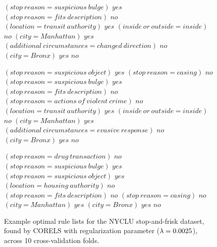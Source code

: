 \begin{figure}[h!]
\begin{algorithmic}
\State \belif $(stop~reason = suspicious~bulge)$ \bthen $yes$
\State \belif $(stop~reason = fits~description)$ \bthen $no$
\State \belif $(location = transit~authority)$ \bthen $yes$
\State \belif $(inside~or~outside = inside)$ \bthen $no$
\State \belif $(city = Manhattan)$ \bthen $yes$
\State \belif $(additional~circumstances = changed~direction)$ \bthen $no$
\State \belif $(city = Bronx)$ \bthen $yes$
\State \belse $no$
\end{algorithmic}
\vspace{0.5mm}
\begin{algorithmic}
\State \bif $(stop~reason = suspicious~object)$ \bthen $yes$ 
\State \belif $(stop~reason = casing)$ \bthen $no$
\State \belif $(stop~reason = suspicious~bulge)$ \bthen $yes$
\State \belif $(stop~reason = fits~description)$ \bthen $no$
\State \belif $(stop~reason = actions~of~violent~crime)$ \bthen $no$
\State \belif $(location = transit~authority)$ \bthen $yes$
\State \belif $(inside~or~outside = inside)$ \bthen $no$
\State \belif $(city = Manhattan)$ \bthen $yes$
\State \belif $(additional~circumstances = evasive~response)$ \bthen $no$
\State \belif $(city = Bronx)$ \bthen $yes$
\State \belse $no$
\end{algorithmic}
\vspace{0.5mm}
\begin{algorithmic}
\State \bif $(stop~reason = drug~transaction)$ \bthen $no$ 
\State \belif $(stop~reason = suspicious~bulge)$ \bthen $yes$
\State \belif $(stop~reason = suspicious~object)$ \bthen $yes$
\State \belif $(location = housing~authority)$ \bthen $no$
\State \belif $(stop~reason = fits~description)$ \bthen $no$
\State \belif $(stop~reason = casing)$ \bthen $no$
\State \belif $(city = Manhattan)$ \bthen $yes$
\State \belif $(city = Bronx)$ \bthen $yes$
\State \belse $no$
\end{algorithmic}
\caption{Example optimal rule lists for the NYCLU stop-and-frisk dataset,
found by CORELS with regularization parameter (${\lambda} = 0.0025$), across 10 cross-validation folds.
}
\label{fig:weapon-rule-list-0025}
\end{figure}
